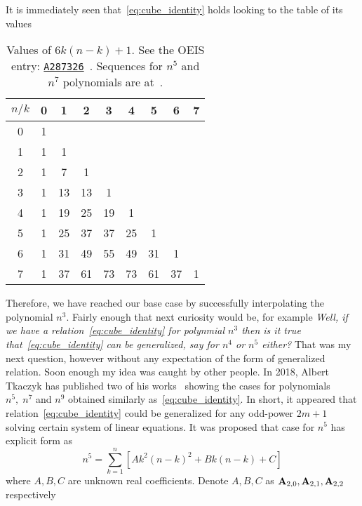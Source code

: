 It is immediately seen that~\eqref{eq:cube_identity} holds looking to the table of its values
\begin{table}[H]
    \setlength\extrarowheight{-6pt}
    \begin{tabular}{c|cccccccc}
        $n/k$ & 0 & 1  & 2  & 3  & 4  & 5  & 6  & 7 \\
        \hline
        0     & 1 &    &    &    &    &    &    &   \\
        1     & 1 & 1  &    &    &    &    &    &   \\
        2     & 1 & 7  & 1  &    &    &    &    &   \\
        3     & 1 & 13 & 13 & 1  &    &    &    &   \\
        4     & 1 & 19 & 25 & 19 & 1  &    &    &   \\
        5     & 1 & 25 & 37 & 37 & 25 & 1  &    &   \\
        6     & 1 & 31 & 49 & 55 & 49 & 31 & 1  &   \\
        7     & 1 & 37 & 61 & 73 & 73 & 61 & 37 & 1
    \end{tabular}
    \caption{Values of $6k(n-k) + 1$.
    See the OEIS entry: \href{https://oeis.org/A287326}{\texttt{A287326}}~\cite{kolosov2017third}.
    Sequences for $n^{5}$ and $n^7$ polynomials are at~\cite{kolosov2018fifth, kolosov2018seventh}.
    }
    \label{tab:fig_1}
\end{table}
Therefore, we have reached our base case by successfully interpolating the polynomial $n^3$.
Fairly enough that next curiosity would be, for example
\textit{Well, if we have a relation~\eqref{eq:cube_identity}
for polynmial $n^3$ then is it true that~\eqref{eq:cube_identity} can be generalized, say for $n^4$ or $n^5$ either?}
That was my next question, however without any expectation of the form of generalized relation.
Soon enough my idea was caught by other people.
In 2018, Albert Tkaczyk has published two of his works~\cite{tkaczyk2018problem, tkaczyk2018continuation}
showing the cases for polynomials $n^5, \; n^7$ and $n^9$ obtained similarly as~\eqref{eq:cube_identity}.
In short, it appeared that relation~\eqref{eq:cube_identity} could be generalized
for any odd-power $2m+1$ solving certain system of linear equations.
It was proposed that case for $n^5$ has explicit form as
\begin{equation*}
    n^5 = \sum_{k=1}^{n} \left[ A k^2(n-k)^2 + Bk(n-k) + C \right]
\end{equation*}
where $A,B,C$ are unknown real coefficients.
Denote $A,B,C$ as ${\mathbf{A}} \sb{2,0}, {\mathbf{A}} \sb{2,1}, {\mathbf{A}} \sb{2,2}$ respectively
